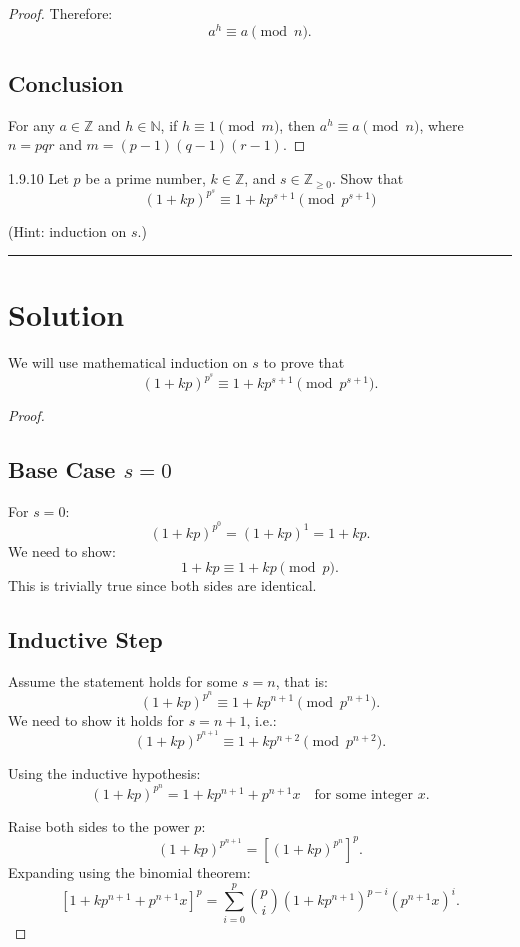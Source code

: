 \documentclass[12pt]{amsart}
\theoremstyle{definition}
\numberwithin{equation}{section}
\newcommand{\Z}{\mathbb{Z}}
\begin{document}
\begin{exercise}{2}
\begin{proof}
Therefore:
\[
a^h \equiv a \pmod{n}.
\]

\subsection*{Conclusion}
For any \(a \in \mathbb{Z}\) and \(h \in \mathbb{N}\), if \(h \equiv 1 \pmod{m}\), then \(a^h \equiv a \pmod{n}\), where \(n = pqr\) and \(m = (p-1)(q-1)(r-1)\).

\end{proof}

\end{exercise}
\newpage

\begin{exercise}{1.9.10} 
Let \(p\) be a prime number, \(k \in \Z\), and \(s \in \Z_{\geq 0}\). Show that 
\[
(1+kp)^{p^s} \equiv 1 + kp^{s+1} \pmod{p^{s+1}}
\]

(Hint: induction on \(s\).)

\noindent\rule{\linewidth}{1pt}

\section*{Solution}

We will use mathematical induction on \(s\) to prove that 
\[
(1+kp)^{p^s} \equiv 1 + kp^{s+1} \pmod{p^{s+1}}.
\]

\begin{proof} \( \)

\subsection*{Base Case \(s = 0\)}
For \(s = 0\):
\[
(1 + kp)^{p^0} = (1 + kp)^1 = 1 + kp.
\]
We need to show:
\[
1 + kp \equiv 1 + kp \pmod{p}.
\]
This is trivially true since both sides are identical.

\subsection*{Inductive Step}
Assume the statement holds for some \(s = n\), that is:
\[
(1 + kp)^{p^n} \equiv 1 + kp^{n+1} \pmod{p^{n+1}}.
\]
We need to show it holds for \(s = n+1\), i.e.:
\[
(1 + kp)^{p^{n+1}} \equiv 1 + kp^{n+2} \pmod{p^{n+2}}.
\]

Using the inductive hypothesis:
\[
(1 + kp)^{p^n} = 1 + kp^{n+1} + p^{n+1}x \quad \text{for some integer } x.
\]

Raise both sides to the power \(p\):
\[
(1 + kp)^{p^{n+1}} = \left[(1 + kp)^{p^n}\right]^p.
\]
Expanding using the binomial theorem:
\[
\left[1 + kp^{n+1} + p^{n+1}x\right]^p = \sum_{i=0}^p \binom{p}{i} (1 + kp^{n+1})^{p-i} (p^{n+1}x)^i.
\]


\end{proof}
\end{exercise}
\end{document}
